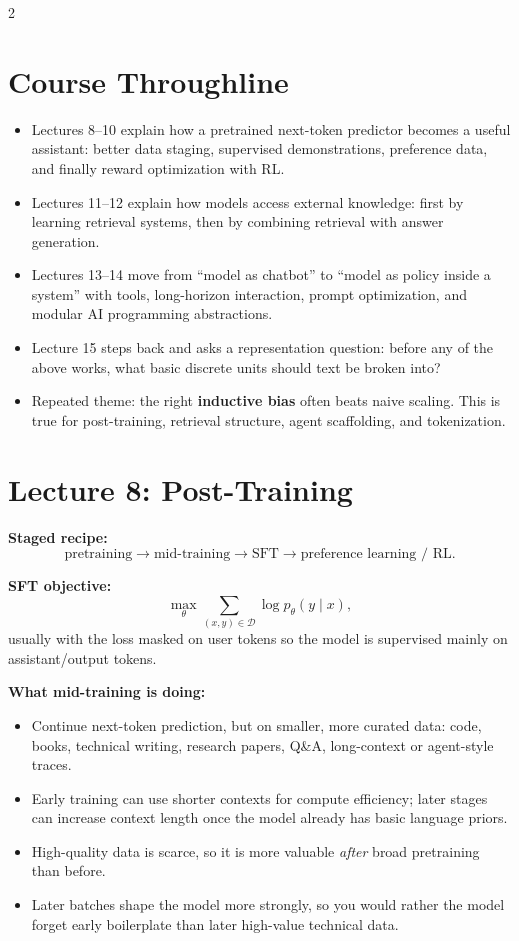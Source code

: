 \documentclass[10pt]{article}
\begin{document}
\begin{multicols*}{2}
\section*{Course Throughline}
\begin{itemize}
\item Lectures 8--10 explain how a pretrained next-token predictor becomes a useful assistant: better data staging, supervised demonstrations, preference data, and finally reward optimization with RL.
\item Lectures 11--12 explain how models access external knowledge: first by learning retrieval systems, then by combining retrieval with answer generation.
\item Lectures 13--14 move from ``model as chatbot'' to ``model as policy inside a system'' with tools, long-horizon interaction, prompt optimization, and modular AI programming abstractions.
\item Lecture 15 steps back and asks a representation question: before any of the above works, what basic discrete units should text be broken into?
\item Repeated theme: the right \textbf{inductive bias} often beats naive scaling. This is true for post-training, retrieval structure, agent scaffolding, and tokenization.
\end{itemize}

\section*{Lecture 8: Post-Training}
\textbf{Staged recipe:}
\[
\text{pretraining}
\rightarrow
\text{mid-training}
\rightarrow
\text{SFT}
\rightarrow
\text{preference learning / RL}.
\]

\textbf{SFT objective:}
\[
\max_\theta \sum_{(x,y)\in \mathcal{D}} \log p_\theta(y \mid x),
\]
usually with the loss masked on user tokens so the model is supervised mainly on assistant/output tokens.

\textbf{What mid-training is doing:}
\begin{itemize}
\item Continue next-token prediction, but on smaller, more curated data: code, books, technical writing, research papers, Q\&A, long-context or agent-style traces.
\item Early training can use shorter contexts for compute efficiency; later stages can increase context length once the model already has basic language priors.
\item High-quality data is scarce, so it is more valuable \emph{after} broad pretraining than before.
\item Later batches shape the model more strongly, so you would rather the model forget early boilerplate than later high-value technical data.
\end{itemize}


\end{multicols*}
\end{document}
